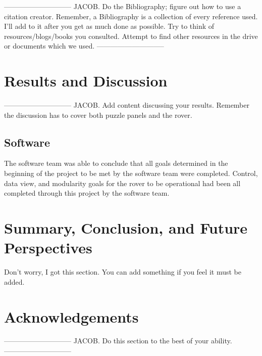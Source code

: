 \documentclass[a4paper, 10pt]{article}
\begin{document}
-----------------------------
JACOB. Do the Bibliography; figure out how to use a citation creator. Remember, a Bibliography is a collection of every reference used. I'll add to it after you get as much done as possible. Try to think of resources/blogs/books you consulted. Attempt to find other resources in the drive or documents which we used.
-----------------------------

\section{Results and Discussion}
-----------------------------
JACOB. Add content discussing your results. Remember the discussion has to cover both puzzle panels and the rover.
    \subsection{Software}
    The software team was able to conclude that all goals determined in the beginning of the project to be met by the software team were completed. Control, data view, and modularity goals for the rover to be operational had been all completed through this project by the software team. 

\section{Summary, Conclusion, and Future Perspectives}
Don't worry, I got this section. You can add something if you feel it must be added.

\section{Acknowledgements}
-----------------------------
JACOB. Do this section to the best of your ability. 
-----------------------------
\end{document}
